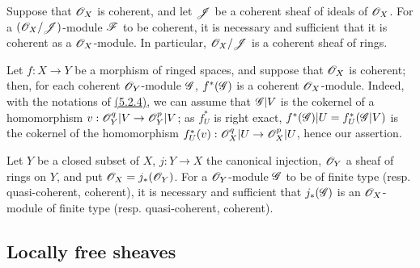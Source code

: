 \begin{env}[5.3.10]
\label{env-0.5.3.10}
Suppose that $\mathscr{O}_X$ is coherent, and let $\mathscr{J}$ be a coherent sheaf of ideals
of $\mathscr{O}_X$. For a $(\mathscr{O}_X/\mathscr{J})$-module $\mathscr{F}$ to be coherent, it is
necessary and sufficient that it is coherent as a $\mathscr{O}_X$-module. In particular,
$\mathscr{O}_X/\mathscr{J}$ is a coherent sheaf of rings.
\end{env}

\begin{env}[5.3.11]
\label{env-0.5.3.11}
Let $f:X\to Y$ be a morphism of ringed spaces, and suppose that $\mathscr{O}_X$ is
coherent; then, for each coherent $\mathscr{O}_Y$-module $\mathscr{G}$, $f^*(\mathscr{G})$ is a
coherent $\mathscr{O}_X$-module. Indeed, with the notations of \hyperref[env-0.5.2.4]{(5.2.4)}, we can
assume that $\mathscr{G}|V$ is the cokernel of a homomorphism
$v:\mathscr{O}_Y^q|V\to\mathscr{O}_Y^p|V$; as $f_U^*$ is right exact,
$f^*(\mathscr{G})|U=f_U^*(\mathscr{G}|V)$ is the cokernel of the homomorphism
$f_U^*(v):\mathscr{O}_X^q|U\to\mathscr{O}_X^p|U$, hence our assertion.
\end{env}

\begin{env}[5.3.12]
\label{env-0.5.3.12}
Let $Y$ be a closed subset of $X$, $j:Y\to X$ the canonical injection, $\mathscr{O}_Y$ a
sheaf of rings on $Y$, and put $\mathscr{O}_X=j_*(\mathscr{O}_Y)$. For a $\mathscr{O}_Y$-module $\mathscr{G}$
to be of finite type (resp. quasi-coherent, coherent), it is necessary and
sufficient that $j_*(\mathscr{G})$ is an $\mathscr{O}_X$-module of finite type
(resp. quasi-coherent, coherent).
\end{env}

\subsection{Locally free sheaves}
\label{subsection-locally-free-sheaves}

